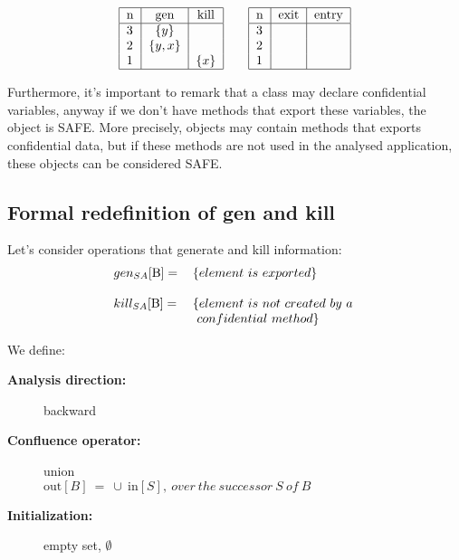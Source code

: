 \documentclass[letterpaper,twocolumn,10pt]{article}
\begin{document}
\begin{align*}
\begin{tabular}{|l|*{2}{c|}}
  \hline
  n & gen & kill  \\
  \hline 
  3 & $\{y \}$ & \\ 
  2 & $\{y, x\}$ & \\
  1 &  & $\{x\}$ \\
  \hline
\end{tabular}
\qquad
\begin{tabular}{|l|*{2}{c|}}
  \hline
  n & exit & entry  \\
  \hline 
  3 &  & \\ 
  2 &  &\\
  1 &  & \\
  \hline
\end{tabular}
\end{align*}

Furthermore, it's important to remark that a class may declare confidential variables, anyway if we don't have methods that export these variables, the object is SAFE. More precisely, objects may contain methods that exports confidential data, but if these methods are not used in the analysed application, these objects can be considered SAFE. \\

\subsection{Formal redefinition of gen and kill}
Let's consider operations that generate and kill information:
\begin{align*}
\begin{tabular}{  l l }
	$ gen_{SA}[\text{B}]= $ & $ \{ element\ is\ exported \} $\\ 
	& \\                  
	$  kill_{SA}[\text{B}]= $ & $ \{ element\ is\ not\ created\ by\ a\ $\\ 
	& $\ confidential\ method \} $ \\
\end{tabular}
\end{align*}

We define: 
\begin{description}
\item[\textbf{Analysis direction:}] backward
\item[\textbf{Confluence operator: }] union\\ $ \text{out}[B]\ =\ \cup\ \text{in}[S],\ over\ the\ successor\ S\ of\ B\  $
\item[\textbf{Initialization: }] empty set, \quad $ \emptyset $
\end{description}
\end{document}
